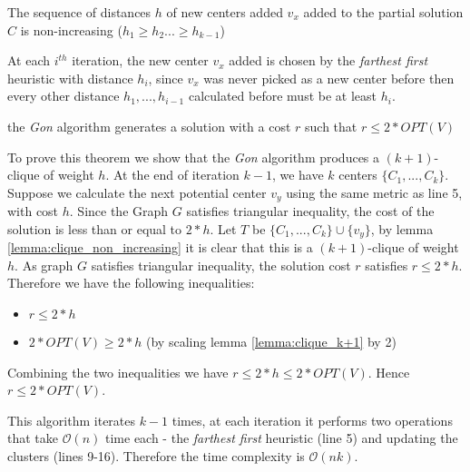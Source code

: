\begin{lemma}\label{lemma:clique_non_increasing}
The sequence of distances $h$ of new centers added $v_x$ added to the partial solution $C$ is non-increasing ($h_1\geq h_2 ...\geq h_{k-1}$)
\end{lemma}

At each $i^{th}$ iteration, the new center $v_x$ added is chosen by the \emph{farthest first} heuristic with distance $h_i$, since $v_x$ was never picked as a new center before then every other distance $h_1,...,h_{i-1}$ calculated before must be at least $h_i$.

\begin{theorem} 
the \emph{Gon} algorithm generates a solution with a cost $r$ such that $r\leq 2 * OPT(V)$
\end{theorem}

To prove this theorem we show that the \emph{Gon} algorithm produces a $(k+1)$-clique of weight $h$. At the end of iteration $k-1$, we have $k$ centers $\{C_1, ...,C_k\}$. Suppose we calculate the next potential center $v_y$ using the same metric as line 5, with cost $h$. Since the Graph $G$ satisfies triangular inequality, the cost of the solution is less than or equal to $2*h$. Let $T$ be $\{C_1, ...,C_k\}\cup\{v_y\}$, by lemma \ref{lemma:clique_non_increasing} it is clear that this is a $(k+1)$-clique of weight $h$. As graph $G$ satisfies triangular inequality, the solution cost $r$ satisfies $r\leq 2*h$. Therefore we have the following inequalities:
\begin{itemize}
    \item $r\leq 2*h$
    \item $2 * OPT(V)\geq 2*h$ (by scaling lemma \ref{lemma:clique_k+1} by 2) 
\end{itemize}
Combining the two inequalities we have $r\leq 2*h\leq 2 * OPT(V)$. Hence $r\leq 2 * OPT(V)$.

This algorithm iterates $k-1$ times, at each iteration it performs two operations that take $\mathcal{O}(n)$ time each - the \emph{farthest first} heuristic (line 5) and updating the clusters (lines 9-16). Therefore the time complexity is $\mathcal{O}(nk)$.
